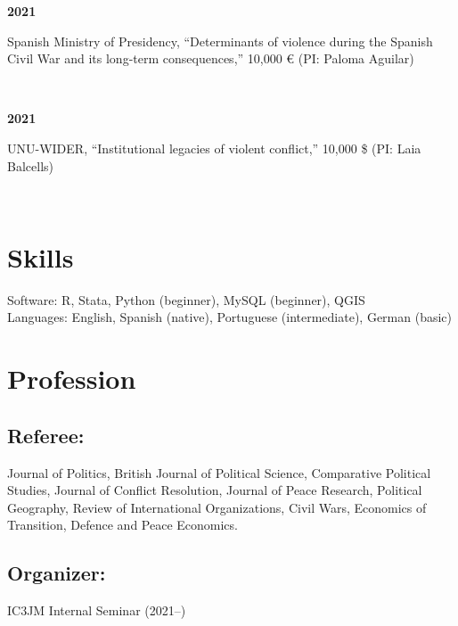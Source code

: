 \documentclass[a4paper, 12pt]{article}
\begin{document}
\begin{minipage}[t]{0.1\textwidth}
\textbf{2021}
\end{minipage}\hfill\begin{minipage}[t]{0.9\textwidth}
Spanish Ministry of Presidency, ``Determinants of violence during the Spanish Civil War and its long-term consequences,'' 10,000 € (PI: Paloma Aguilar)\\\vspace{-8pt}
\end{minipage}\\
\begin{minipage}[t]{0.1\textwidth}
\textbf{2021}
\end{minipage}\hfill\begin{minipage}[t]{0.9\textwidth}
UNU-WIDER, ``Institutional legacies of violent conflict,'' 10,000 \$ (PI: Laia Balcells)
\end{minipage}\\


\section*{Skills}

Software: R, Stata, Python (beginner), MySQL (beginner), QGIS\\
Languages: English, Spanish (native), Portuguese (intermediate), German (basic)

\section*{Profession}

\subsection*{Referee:}

Journal of Politics, British Journal of Political Science, Comparative Political Studies, Journal of Conflict Resolution, Journal of Peace Research, Political Geography, Review of International Organizations, Civil Wars, Economics of Transition, Defence and Peace Economics.

\subsection*{Organizer:}

IC3JM Internal Seminar (2021--)
\end{document}
